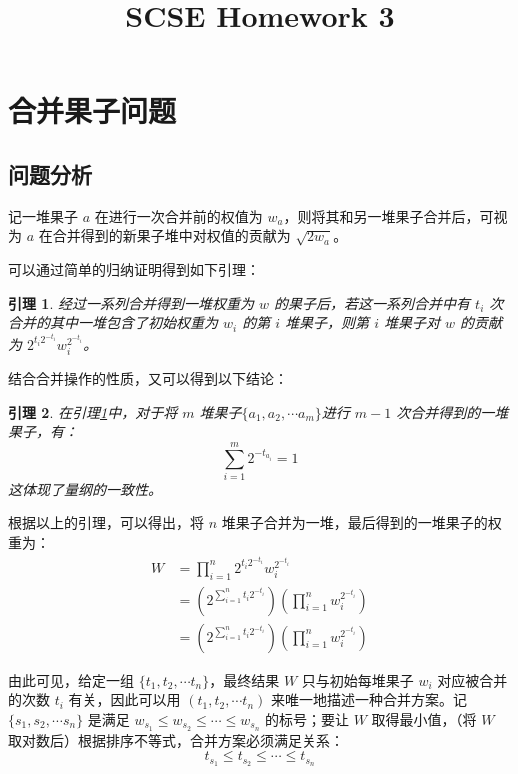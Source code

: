 \documentclass[11pt]{article}
\begin{document}
\title{SCSE Homework 3}
\author{}
\date{}
\maketitle

\section{合并果子问题}
\subsection*{问题分析}
    \newtheorem{lemma}{引理 }
    \newtheorem{theorem}{定理 }

    记一堆果子 $a$ 在进行一次合并前的权值为 $w_a$，则将其和另一堆果子合并后，可视为 $a$ 在合并得到的新果子堆中对权值的贡献为 $\sqrt{2w_a}$。

    可以通过简单的归纳证明得到如下引理：
    \begin{lemma}\label{lemma:weightcontribute}
        经过一系列合并得到一堆权重为 $w$ 的果子后，若这一系列合并中有 $t_i$ 次合并的其中一堆包含了初始权重为 $w_i$ 的第 $i$ 堆果子，则第 $i$ 堆果子对 $w$ 的贡献为 $2^{t_i2^{-t_i}}w_{i}^{2^{-t_i}}$。
    \end{lemma}

    结合合并操作的性质，又可以得到以下结论：
    \begin{lemma}
        在引理\ref{lemma:weightcontribute}中，对于将 $m$ 堆果子$\{a_1, a_2, \cdots a_m\}$进行 $m-1$ 次合并得到的一堆果子，有：
        $$\sum_{i=1}^{m}{2^{-t_{a_i}}} = 1$$
        这体现了量纲的一致性。
    \end{lemma}

    根据以上的引理，可以得出，将 $n$ 堆果子合并为一堆，最后得到的一堆果子的权重为：
    \begin{equation}
        \begin{aligned}
            W & = \prod_{i=1}^{n}{2^{t_i2^{-t_i}}w_{i}^{2^{-t_i}}}\\
              & = (2^{\sum_{i=1}^{n}{t_i2^{-t_i}}})(\prod_{i=1}^{n}{w_{i}^{2^{-t_i}}})\\
              & = (2^{\sum_{i=1}^{n}{t_i2^{-t_i}}})(\prod_{i=1}^{n}{w_{i}^{2^{-t_i}}})
        \end{aligned}
    \end{equation}

    由此可见，给定一组 $\{t_1, t_2, \cdots t_n\}$，最终结果 $W$ 只与初始每堆果子 $w_i$ 对应被合并的次数 $t_i$ 有关，因此可以用 $(t_1, t_2, \cdots t_n)$ 来唯一地描述一种合并方案。记 $\{s_1, s_2, \cdots s_n\}$ 是满足 $w_{s_1} \leq w_{s_2} \leq \cdots \leq w_{s_n}$ 的标号；要让 $W$ 取得最小值，（将 $W$ 取对数后）根据排序不等式，合并方案必须满足关系：
    \begin{equation}\label{merge:order}
        t_{s_1} \leq t_{s_2} \leq \cdots \leq t_{s_n}
    \end{equation} 
\end{document}
